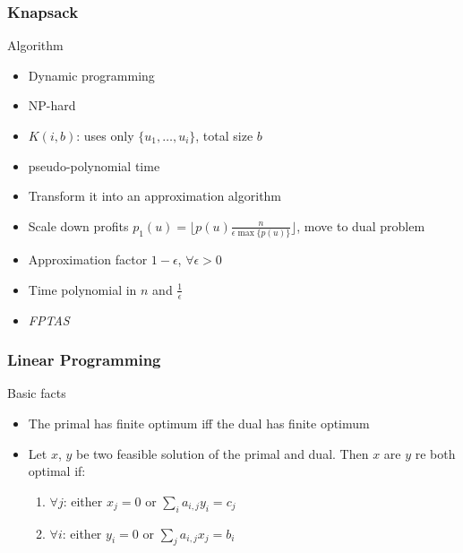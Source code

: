 \documentclass[12pt,aspectratio=169]{beamer}
\begin{document}
\begin{frame}\frametitle{Knapsack }
  \begin{block}{Algorithm}
    \begin{itemize}[<.->]
    \item
      Dynamic programming
    \item
      NP-hard
    \item
      $K(i,b)$: uses only $\{u_{1}, \ldots, u_{i}\}$, total size $b$
    \item
      pseudo-polynomial time
    \item
      Transform it into an approximation algorithm
    \item
      Scale down profits $p_{1}(u) = \lfloor p(u) \frac{n}{\epsilon \max\{p(u)\}} \rfloor$, move to dual problem
    \item
      Approximation factor $1-\epsilon$, $\forall \epsilon>0$
    \item
      Time polynomial in $n$ and $\frac{1}{\epsilon}$
    \item
      \emph{FPTAS}
    \end{itemize}
  \end{block}
\end{frame} 

\begin{frame}\frametitle{Linear Programming }
  \begin{block}{Basic facts}
    \begin{itemize}
    \item
      The primal has finite optimum iff the dual has finite optimum
    \item
      Let $x$, $y$ be two feasible solution of the primal and dual.
%
      Then $x$ are $y$ re both optimal if:
      \begin{enumerate}
      \item
        $\forall j$: either $x_{j}=0$ or $\sum_{i} a_{i,j}y_{i} = c_{j}$
      \item
        $\forall i$: either $y_{i}=0$ or $\sum_{j} a_{i,j}x_{j} = b_{i}$
      \end{enumerate}
    \end{itemize}
  \end{block}
\end{frame}
\end{document}
